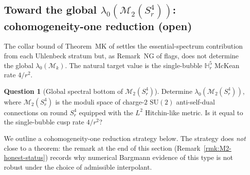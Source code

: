 \documentclass[11pt,letterpaper]{article}
\theoremstyle{definition}
\newtheorem{question}[theorem]{Question}
\newcommand{\bbH}{\mathbb{H}}
\newcommand{\cM}{\mathcal{M}}
\begin{document}
\fi

\subsection{Toward the global \texorpdfstring{$\lambda_0(\cM_2(S^4_r))$}{lambda\_0(M\_2)}: cohomogeneity-one reduction (open)}\label{sec:M2-global}

The collar bound of Theorem~MK of \cite{bonfioli-core} settles the essential-spectrum contribution from each Uhlenbeck stratum but, as Remark~NG of \cite{bonfioli-core} flags, does not determine the global $\lambda_0(\cM_k)$. The natural target value is the single-bubble $\bbH^5_r$ McKean rate $4/r^2$.

\begin{question}[Global spectral bottom of $\cM_2(S^4_r)$]\label{q:M2-global-bottom}
Determine $\lambda_0(\cM_2(S^4_r))$, where $\cM_2(S^4_r)$ is the moduli space of charge-$2$ $\mathrm{SU}(2)$ anti-self-dual connections on round $S^4_r$ equipped with the $L^2$ Hitchin-like metric. Is it equal to the single-bubble cusp rate $4/r^2$?
\end{question}

\noindent We outline a cohomogeneity-one reduction strategy below. The strategy does \emph{not} close to a theorem: the remark at the end of this section (Remark~\ref{rmk:M2-honest-status}) records why numerical Bargmann evidence of this type is not robust under the choice of admissible interpolant.
\end{document}
